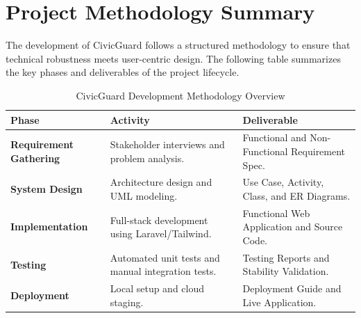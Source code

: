 \section{Project Methodology Summary}
The development of CivicGuard follows a structured methodology to ensure that technical robustness meets user-centric design. The following table summarizes the key phases and deliverables of the project lifecycle.

\begin{table}[H]
\centering
\renewcommand{\arraystretch}{1.3}
\begin{tabular}{|p{3cm}|p{5cm}|p{7cm}|}
\hline
\textbf{Phase} & \textbf{Activity} & \textbf{Deliverable} \\ \hline
\textbf{Requirement Gathering} & Stakeholder interviews and problem analysis. & Functional and Non-Functional Requirement Spec. \\ \hline
\textbf{System Design} & Architecture design and UML modeling. & Use Case, Activity, Class, and ER Diagrams. \\ \hline
\textbf{Implementation} & Full-stack development using Laravel/Tailwind. & Functional Web Application and Source Code. \\ \hline
\textbf{Testing} & Automated unit tests and manual integration tests. & Testing Reports and Stability Validation. \\ \hline
\textbf{Deployment} & Local setup and cloud staging. & Deployment Guide and Live Application. \\ \hline
\end{tabular}
\caption{CivicGuard Development Methodology Overview}
\label{tab:methodology}
\end{table}
